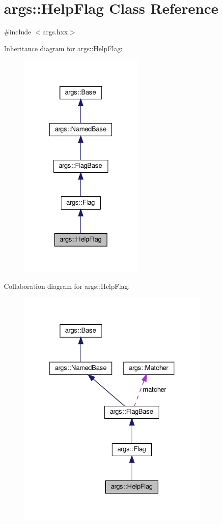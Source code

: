 \hypertarget{classargs_1_1_help_flag}{}\section{args\+:\+:Help\+Flag Class Reference}
\label{classargs_1_1_help_flag}


{\ttfamily \#include $<$args.\+hxx$>$}



Inheritance diagram for args\+:\+:Help\+Flag\+:\nopagebreak
\begin{figure}[H]
\begin{center}
\leavevmode
\includegraphics[width=175pt]{classargs_1_1_help_flag__inherit__graph}
\end{center}
\end{figure}


Collaboration diagram for args\+:\+:Help\+Flag\+:\nopagebreak
\begin{figure}[H]
\begin{center}
\leavevmode
\includegraphics[width=270pt]{classargs_1_1_help_flag__coll__graph}
\end{center}
\end{figure}
